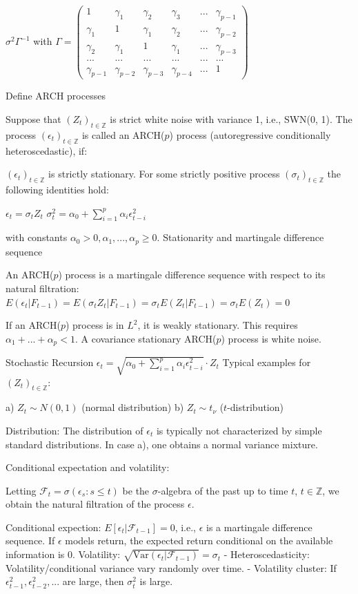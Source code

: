 \(\sigma^2 \Gamma^{-1}\) with \(\Gamma = \begin{pmatrix} 1 & \gamma_1 & \gamma_2 & \gamma_3 & ... & \gamma_{p - 1} \\ \gamma_1 & 1 & \gamma_1 & \gamma_2 & ... & \gamma_{p - 2} \\ \gamma_2 & \gamma_1 & 1 & \gamma_1 & ... & \gamma_{p - 3} \\ ... & ... & ... & ... & ... & ... \\ \gamma_{p - 1} & \gamma_{p - 2} & \gamma_{p - 3} & \gamma_{p - 4} & ... & 1 \end{pmatrix}\)


Define ARCH processes

Suppose that \((Z_t)_{t \in \mathbb{Z}}\) is strict white noise with variance 1, i.e., SWN(0, 1). 
The process \((\epsilon_t)_{t \in \mathbb{Z}}\) is called an ARCH(\(p\)) process (autoregressive conditionally heteroscedastic), if:

\((\epsilon_t)_{t \in \mathbb{Z}}\) is strictly stationary.
For some strictly positive process \((\sigma_t)_{t \in \mathbb{Z}}\) the following identities hold:

\(\epsilon_t = \sigma_t Z_t\)
\(\sigma_t^2 = \alpha_0 + \sum_{i = 1}^p \alpha_i \epsilon_{t - i}^2\)

with constants \(\alpha_0 > 0, \alpha_1, ..., \alpha_p \ge 0\).
Stationarity and martingale difference sequence

An ARCH(\(p\)) process is a martingale difference sequence with respect to its natural filtration:
\(E(\epsilon_t | F_{t - 1}) = E(\sigma_t Z_t | F_{t - 1}) = \sigma_t E(Z_t | F_{t - 1}) = \sigma_t E(Z_t) = 0\)

If an ARCH(\(p\)) process is in \(L^2\), it is weakly stationary. This requires \(\alpha_1 + ... + \alpha_p < 1\).
A covariance stationary ARCH(\(p\)) process is white noise.


Stochastic Recursion
\(\epsilon_t = \sqrt{\alpha_0 + \sum_{i = 1}^p \alpha_i \epsilon_{t - i}^2} \cdot Z_t\)
Typical examples for \((Z_t)_{t \in \mathbb{Z}}\):

a) \(Z_t \sim N(0, 1)\) (normal distribution)
b) \(Z_t \sim t_\nu\) (\(t\)-distribution)

Distribution:
The distribution of \(\epsilon_t\) is typically not characterized by simple standard distributions.
In case a), one obtains a normal variance mixture.


Conditional expectation and volatility:

Letting \(\mathcal{F}_t = \sigma(\epsilon_s: s \le t)\) be the \(\sigma\)-algebra of the past up to time \(t\), 
\(t \in \mathbb{Z}\), we obtain the natural filtration of the process \(\epsilon\).

Conditional expection: \(E[\epsilon_t | \mathcal{F}_{t - 1}] = 0\), i.e., \(\epsilon\) is a martingale difference sequence. 
If \(\epsilon\) models return, the expected return conditional on the available information is 0.
Volatility: \(\sqrt{\text{Var}(\epsilon_t | \mathcal{F}_{t - 1})} = \sigma_t\)
- Heteroscedasticity: Volatility/conditional variance vary randomly over time.
- Volatility cluster: If \(\epsilon_{t - 1}^2, \epsilon_{t - 2}^2, ...\) are large, then \(\sigma_t^2\) is large.
